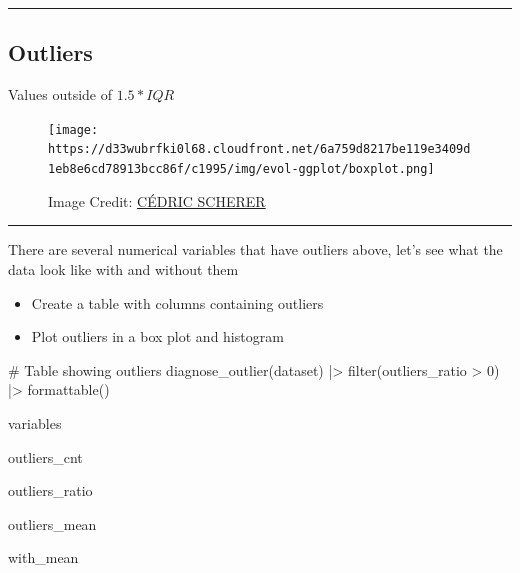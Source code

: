 \documentclass[
  letterpaper,
  DIV=11,
  numbers=noendperiod]{scrreprt}
\newenvironment{Shaded}{\begin{snugshade}}{\end{snugshade}}
\newcommand{\CommentTok}[1]{\textcolor[rgb]{0.37,0.37,0.37}{#1}}
\newcommand{\DecValTok}[1]{\textcolor[rgb]{0.68,0.00,0.00}{#1}}
\newcommand{\FunctionTok}[1]{\textcolor[rgb]{0.28,0.35,0.67}{#1}}
\newcommand{\NormalTok}[1]{\textcolor[rgb]{0.00,0.23,0.31}{#1}}
\newcommand{\SpecialCharTok}[1]{\textcolor[rgb]{0.37,0.37,0.37}{#1}}
\begin{document}
\begin{center}\rule{0.5\linewidth}{0.5pt}\end{center}

\hypertarget{outliers}{%
\subsection{Outliers}\label{outliers}}

Values outside of \(1.5 * IQR\)

\begin{figure}

{\centering \texttt{[image: https://d33wubrfki0l68.cloudfront.net/6a759d8217be119e3409d1eb8e6cd78913bcc86f/c1995/img/evol-ggplot/boxplot.png]}

}

\caption{Image Credit:
\href{https://www.cedricscherer.com/2019/05/17/the-evolution-of-a-ggplot-ep.-1/}{CÉDRIC
SCHERER}}

\end{figure}

\begin{center}\rule{0.5\linewidth}{0.5pt}\end{center}

There are several numerical variables that have outliers above, let's
see what the data look like with and without them

\begin{itemize}
\item
  Create a table with columns containing outliers
\item
  Plot outliers in a box plot and histogram
\end{itemize}

\begin{Shaded}
\begin{Highlighting}[]
\CommentTok{\# Table showing outliers}
\FunctionTok{diagnose\_outlier}\NormalTok{(dataset) }\SpecialCharTok{|\textgreater{}}
  \FunctionTok{filter}\NormalTok{(outliers\_ratio }\SpecialCharTok{\textgreater{}} \DecValTok{0}\NormalTok{) }\SpecialCharTok{|\textgreater{}}
  \FunctionTok{formattable}\NormalTok{()}
\end{Highlighting}
\end{Shaded}

variables

outliers\_cnt

outliers\_ratio

outliers\_mean

with\_mean
\end{document}
